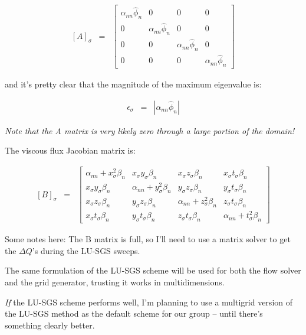 \begin{eqnarray}
\left[A \right]_{\sigma}
&=&
\left[
\begin{array}{cccc}
\alpha_{nn} \widehat{\phi}_n & 0 & 0 & 0 \\
0 & \alpha_{nn} \widehat{\phi}_n & 0 & 0 \\
0 & 0 & \alpha_{nn} \widehat{\phi}_n & 0 \\
0 & 0 & 0 & \alpha_{nn} \widehat{\phi}_n 
\end{array}
\right]
\nonumber
\end{eqnarray}

and it's pretty clear that the magnitude of the maximum eigenvalue is:

\begin{eqnarray}
\epsilon_{\sigma} &=& \left|
\alpha_{nn} \widehat{\phi}_n
\right|
\nonumber
\end{eqnarray}

\emph{Note that the A matrix is very likely zero through a large portion
of the domain!}

The viscous flux Jacobian matrix is:

\begin{eqnarray}
\left[B \right]_{\sigma}
&=&
\left[
\begin{array}{cccc}
\alpha_{nn} + x_{\sigma}^2 \beta_n & 
x_{\sigma} y_{\sigma} \beta_n & 
x_{\sigma} z_{\sigma} \beta_n & 
x_{\sigma} t_{\sigma} \beta_n \\
x_{\sigma} y_{\sigma} \beta_n & 
\alpha_{nn} + y_{\sigma}^2 \beta_n & 
y_{\sigma} z_{\sigma} \beta_n & 
y_{\sigma} t_{\sigma} \beta_n \\
x_{\sigma} z_{\sigma} \beta_n & 
y_{\sigma} z_{\sigma} \beta_n & 
\alpha_{nn} + z_{\sigma}^2 \beta_n & 
z_{\sigma} t_{\sigma} \beta_n \\
x_{\sigma} t_{\sigma} \beta_n & 
y_{\sigma} t_{\sigma} \beta_n & 
z_{\sigma} t_{\sigma} \beta_n &
\alpha_{nn} + t_{\sigma}^2 \beta_n
\end{array}
\right]
\nonumber
\end{eqnarray}

Some notes here:  The B matrix is full, so I'll need to use a matrix
solver to get the $\Delta Q$'s during the LU-SGS sweeps.

The same formulation of the LU-SGS scheme will be used for both the flow
solver and the grid generator, trusting it works in multidimensions.

\emph{If} the LU-SGS scheme performs well, I'm planning to use a multigrid
version of the LU-SGS method as the default scheme for our group -- until
there's something clearly better.

